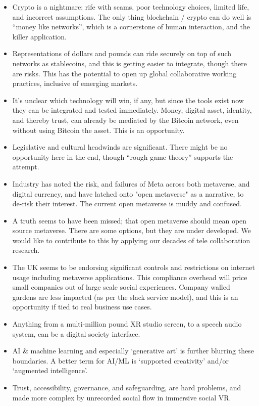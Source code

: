 \begin{itemize}
\item Crypto is a nightmare; rife with scams, poor technology choices, limited life, and incorrect assumptions. The only thing blockchain / crypto can do well is ``money like networks'', which is a cornerstone of human interaction, and the killer application.
\item Representations of dollars and pounds can ride securely on top of such networks as stablecoins, and this is getting easier to integrate, though there are risks. This has the potential to open up global collaborative working practices, inclusive of emerging markets.
\item It's unclear which technology will win, if any, but since the tools exist now they can be integrated and tested immediately. Money, digital asset, identity, and thereby trust, can already be mediated by the Bitcoin network, even without using Bitcoin the asset. This is an opportunity.
\item Legislative and cultural headwinds are significant. There might be no opportunity here in the end, though ``rough game theory'' supports the attempt.
\item Industry has noted the risk, and failures of Meta across both metaverse, and digital currency, and have latched onto "open metaverse" as a narrative, to de-risk their interest. The current open metaverse is muddy and confused. 
\item A truth seems to have been missed; that open metaverse should mean open source metaverse. There are some options, but they are under developed. We would like to contribute to this by applying our decades of tele collaboration research. 
\item The UK seems to be endorsing significant controls and restrictions on internet usage including metaverse applications. This compliance overhead will price small companies out of large scale social experiences. Company walled gardens are less impacted (as per the slack service model), and this is an opportunity if tied to real business use cases.
\item Anything from a multi-million pound XR studio screen, to a speech audio system, can be a digital society interface.
\item AI \& machine learning and especially `generative art' is further blurring these boundaries. A better term for AI/ML is `supported creativity' and/or `augmented intelligence'.
\item Trust, accessibility, governance, and safeguarding, are hard problems, and made more complex by unrecorded social flow in immersive social VR.

\end{itemize}
